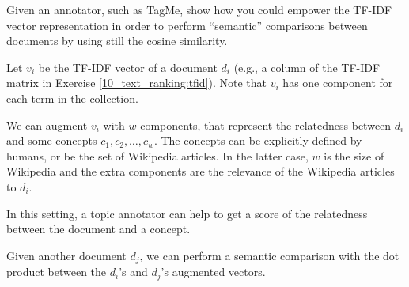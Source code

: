\exercise

Given an annotator, such as TagMe, show how you could empower the TF-IDF vector
representation in order to perform ``semantic'' comparisons between documents by
using still the cosine similarity.

\solution

Let $v_i$ be the TF-IDF vector of a document $d_i$ (e.g., a column of the TF-IDF
matrix in Exercise \ref{10_text_ranking:tfid}). Note that $v_i$ has one
component for each term in the collection.

We can augment $v_i$ with $w$ components, that represent the relatedness between
$d_i$ and some concepts $c_1, c_2, \dots, c_w$.
The concepts can be explicitly defined by humans, or be the set of
Wikipedia articles. In the latter case, $w$ is the size of Wikipedia and the
extra components are the relevance of the Wikipedia articles to $d_i$.

In this setting, a topic annotator can help to get a score of the relatedness
between the document and a concept.

Given another document $d_j$, we can perform a semantic comparison with the dot
product between the $d_i$'s and $d_j$'s augmented vectors.
